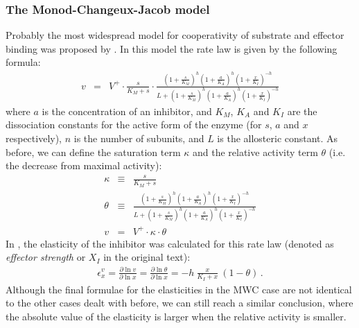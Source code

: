 \documentclass[12pt,a4paper]{article}
\begin{document}
\subsubsection{The Monod-Changeux-Jacob model}
Probably the most widespread model for cooperativity of substrate and effector binding was proposed by \citet{Monod1965-dq}. In this model the rate law is given by the following formula:
\begin{eqnarray}
v &=& V^+ \cdot \frac{s}{K_M + s} \cdot \frac{\left(1 + \frac{s}{K_M}\right)^h \left(1 + \frac{a}{K_A}\right)^h \left(1 + \frac{x}{K_I}\right)^{-h}}{L + \left(1 + \frac{s}{K_M}\right)^h \left(1 + \frac{a}{K_A}\right)^h \left(1 + \frac{x}{K_I}\right)^{-h}}
\end{eqnarray}
where $a$ is the concentration of an inhibitor, and $K_M$, $K_A$ and $K_I$ are the dissociation constants for the active form of the enzyme (for $s$, $a$ and $x$ respectively), $n$ is the number of subunits, and $L$ is the allosteric constant. As before, we can define the saturation term $\kappa$ and the relative activity term $\theta$ (i.e. the decrease from maximal activity):
\begin{eqnarray}
\kappa &\equiv& \frac{s}{K_M + s} \nonumber\\
\theta &\equiv& \frac{\left(1 + \frac{s}{K_M}\right)^h \left(1 + \frac{a}{K_A}\right)^h \left(1 + \frac{x}{K_I}\right)^{-h}}{L + \left(1 + \frac{s}{K_M}\right)^h \left(1 + \frac{a}{K_A}\right)^h \left(1 + \frac{x}{K_I}\right)^{-h}} \nonumber\\
v &=& V^+ \cdot \kappa \cdot \theta
\end{eqnarray}
In \cite{Heinrich1974-yj}, the elasticity of the inhibitor was calculated for this rate law (denoted as \emph{effector strength} or $X_I$ in the original text):
\begin{eqnarray}
\epsilon_x^v = \frac{\partial \ln{v}}{\partial \ln{x}} = \frac{\partial \ln{\theta}}{\partial \ln{x}} = - h~\frac{x}{K_I + x} ~\left(1 - \theta \right)\,.
\end{eqnarray}
Although the final formulae for the elasticities in the MWC case are not identical to the other cases dealt with before, we can still reach a similar conclusion, where the absolute value of the elasticity is larger when the relative activity is smaller.
\end{document}

